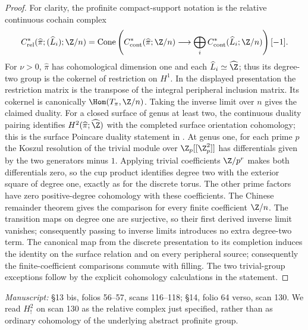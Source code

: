 \begin{proof}
For clarity, the profinite compact-support notation is the relative continuous cochain complex
\[
 C^*_{\mathrm{rel}}(\widehat\pi;(\widehat L_i);\Z/n)
 =\operatorname{Cone}\left(C^*_{\mathrm{cont}}(\widehat\pi;\Z/n)
 \longrightarrow\bigoplus_iC^*_{\mathrm{cont}}(\widehat L_i;\Z/n)\right)[-1].
\]
For $\nu>0$, $\widehat\pi$ has cohomological dimension one and each $\widehat L_i\simeq\widehat\Z$; thus its degree-two group is the cokernel of restriction on $H^1$. In the displayed presentation the restriction matrix is the transpose of the integral peripheral inclusion matrix. Its cokernel is canonically $\Hom(T_\pi,\Z/n)$. Taking the inverse limit over $n$ gives the claimed duality. For a closed surface of genus at least two, the continuous duality pairing identifies $H^2(\widehat\pi;\widehat\Z)$ with the completed surface orientation cohomology; this is the surface Poincare duality statement in \cite[Proposition 1.3]{A_Mochizuki2007}. At genus one, for each prime $p$ the Koszul resolution of the trivial module over $\Z_p[[\Z_p^2]]$ has differentials given by the two generators minus $1$. Applying trivial coefficients $\Z/p^r$ makes both differentials zero, so the cup product identifies degree two with the exterior square of degree one, exactly as for the discrete torus. The other prime factors have zero positive-degree cohomology with these coefficients. The Chinese remainder theorem gives the comparison for every finite coefficient $\Z/n$. The transition maps on degree one are surjective, so their first derived inverse limit vanishes; consequently passing to inverse limits introduces no extra degree-two term. The canonical map from the discrete presentation to its completion induces the identity on the surface relation and on every peripheral source; consequently the finite-coefficient comparisons commute with filling. The two trivial-group exceptions follow by the explicit cohomology calculations in the statement.
\end{proof}
\noindent\emph{Manuscript:} \S13 bis, folios 56--57, scans 116--118; \S14, folio 64 verso, scan 130. We read $H^2_!$ on scan 130 as the relative complex just specified, rather than as ordinary cohomology of the underlying abstract profinite group.

